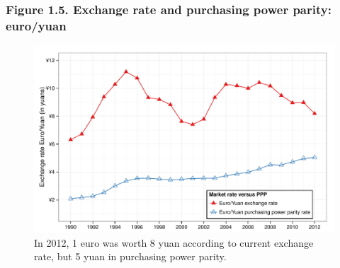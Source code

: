 \documentclass[t]{beamer}\usepackage[]{graphicx}\usepackage[]{color}
\newenvironment{knitrout}{}{} %
\begin{document}
\begin{frame}[label=Figure_1_5,fragile]
\frametitle{Figure 1.5. Exchange rate and purchasing power parity: euro/yuan}
\begin{figure}[t]
\begin{minipage}[b]{\textwidth}
\centering
\begin{knitrout}\footnotesize
{}\color{fgcolor}

{\centering \includegraphics[width=1\linewidth]{figures/color/Figure_1_5} 

}



\end{knitrout}
\caption{In 2012, 1 euro was worth 8 yuan according to current exchange rate, but 5 yuan in purchasing power parity.}
\end{minipage}
\end{figure}
\end{frame}
\end{document}
